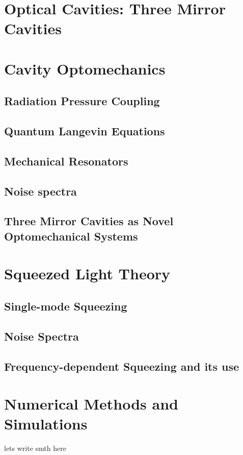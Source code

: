 \section{\texorpdfstring{\color{red}Optical Cavities: Three Mirror Cavities}{Optical Cavities: Three Mirror Cavities}}
\subsection{}
\hspace{1pt}

\section{Cavity Optomechanics}
\subsection{Radiation Pressure Coupling}
\subsection{Quantum Langevin Equations}
\subsection{\texorpdfstring{Mechanical Resonators}{Mechanical Resonators}}
\subsection{Noise spectra}
\subsection{\texorpdfstring{\color{red} Three Mirror Cavities as Novel Optomechanical Systems}{Three Mirror Cavities as Novel Optomechanical Systems}}
\hspace{1pt}

\section{Squeezed Light Theory}
\subsection{Single-mode Squeezing}
\subsection{Noise Spectra }
\subsection{Frequency-dependent Squeezing and its use}
\hspace{1pt}

\section{Numerical Methods and Simulations}

lets write smth here 
